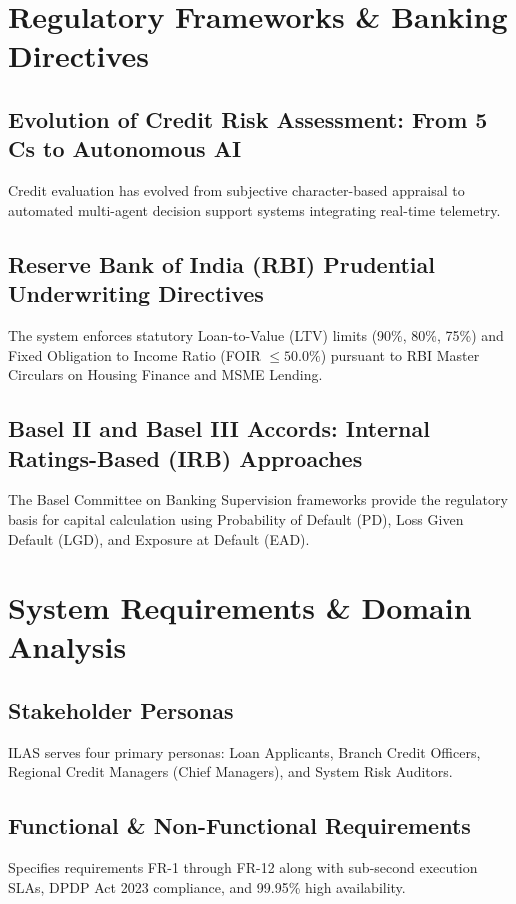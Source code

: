 \documentclass[11pt,a4paper,oneside]{report}
\begin{document}
\chapter{Regulatory Frameworks \& Banking Directives}

\section{Evolution of Credit Risk Assessment: From 5 Cs to Autonomous AI}
Credit evaluation has evolved from subjective character-based appraisal to automated multi-agent decision support systems integrating real-time telemetry.

\section{Reserve Bank of India (RBI) Prudential Underwriting Directives}
The system enforces statutory Loan-to-Value (LTV) limits (90\%, 80\%, 75\%) and Fixed Obligation to Income Ratio (FOIR $\le 50.0\%$) pursuant to RBI Master Circulars on Housing Finance and MSME Lending.

\section{Basel II and Basel III Accords: Internal Ratings-Based (IRB) Approaches}
The Basel Committee on Banking Supervision frameworks provide the regulatory basis for capital calculation using Probability of Default (PD), Loss Given Default (LGD), and Exposure at Default (EAD).

\chapter{System Requirements \& Domain Analysis}

\section{Stakeholder Personas}
ILAS serves four primary personas: Loan Applicants, Branch Credit Officers, Regional Credit Managers (Chief Managers), and System Risk Auditors.

\section{Functional \& Non-Functional Requirements}
Specifies requirements FR-1 through FR-12 along with sub-second execution SLAs, DPDP Act 2023 compliance, and 99.95\% high availability.
\end{document}
